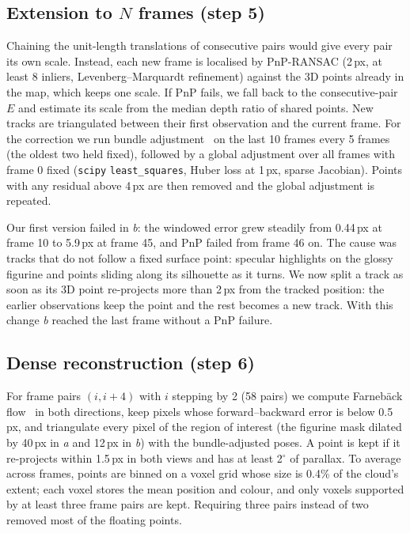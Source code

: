 \documentclass[conference]{assets/latex/IEEEtran}
\begin{document}
\subsection{Extension to $N$ frames (step 5)}
Chaining the unit-length translations of consecutive pairs would give every pair its own scale.
Instead, each new frame is localised by PnP-RANSAC (2\,px, at least 8 inliers, Levenberg--Marquardt
refinement) against the 3D points already in the map, which keeps one scale. If PnP fails, we fall
back to the consecutive-pair $E$ and estimate its scale from the median depth ratio of shared points.
New tracks are triangulated between their first observation and the current frame. For the
correction we run bundle adjustment~\cite{triggs2000} on the last 10 frames every 5 frames (the
oldest two held fixed), followed by a global adjustment over all frames with frame 0 fixed
(\texttt{scipy} \texttt{least\_squares}, Huber loss at 1\,px, sparse Jacobian). Points with any
residual above 4\,px are then removed and the global adjustment is repeated.

Our first version failed in \textit{b}: the windowed error grew steadily from 0.44\,px at frame 10 to 5.9\,px at
frame 45, and PnP failed from frame 46 on. The cause was tracks that do not follow a fixed surface
point: specular highlights on the glossy figurine and points sliding along its silhouette as it
turns. We now split a track as soon as its 3D point re-projects more than 2\,px from the tracked
position: the earlier observations keep the point and the rest becomes a new track. With this change
\textit{b} reached the last frame without a PnP failure.

\subsection{Dense reconstruction (step 6)}
For frame pairs $(i, i+4)$ with $i$ stepping by 2 (58 pairs) we compute Farneb\"ack
flow~\cite{farneback2003} in both directions, keep pixels whose forward--backward error is below
0.5\,px, and triangulate every pixel of the region of interest (the figurine mask dilated by 40\,px in
\textit{a} and 12\,px in \textit{b}) with the bundle-adjusted poses. A point is kept if it
re-projects within 1.5\,px in both views and has at least 2$^\circ$ of parallax. To average across
frames, points are binned on a voxel grid whose size is 0.4\% of the cloud's extent; each voxel
stores the mean position and colour, and only voxels supported by at least three frame pairs are
kept. Requiring three pairs instead of two removed most of the floating points.
\end{document}
